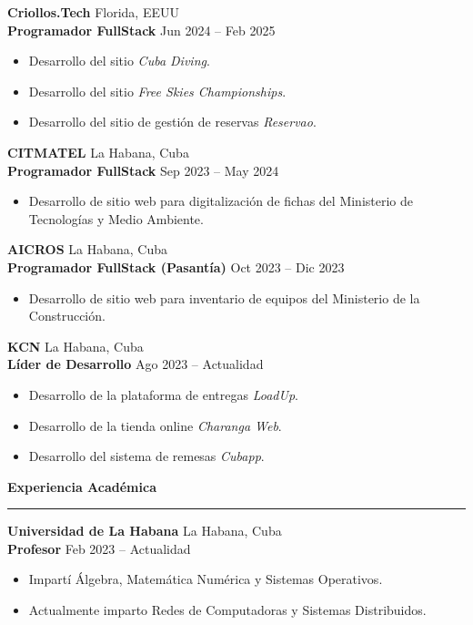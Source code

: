 \documentclass[11pt]{article}
\newcommand{\sectiontitle}[1]{%
	\vspace{30pt}
	{\large \textbf{#1}} \\
	\rule{\linewidth}{0.4pt}

}
\begin{document}
	\vspace{10pt}
	\textbf{Criollos.Tech} \hfill Florida, EEUU \\
	\textbf{Programador FullStack} \hfill Jun 2024 – Feb 2025
	\begin{itemize}[left=10pt,itemsep=3pt]
		\item Desarrollo del sitio \textit{Cuba Diving}.
		\item Desarrollo del sitio \textit{Free Skies Championships}.
		\item Desarrollo del sitio de gestión de reservas \textit{Reservao}.
	\end{itemize}
	
	\vspace{10pt}
	\textbf{CITMATEL} \hfill La Habana, Cuba \\
	\textbf{Programador FullStack} \hfill Sep 2023 – May 2024
	\begin{itemize}[left=10pt,itemsep=3pt]
		\item Desarrollo de sitio web para digitalización de fichas del Ministerio de Tecnologías y Medio Ambiente.
	\end{itemize}
	
	\vspace{10pt}
	\textbf{AICROS} \hfill La Habana, Cuba \\
	\textbf{Programador FullStack (Pasantía)} \hfill Oct 2023 – Dic 2023
	\begin{itemize}[left=10pt,itemsep=3pt]
		\item Desarrollo de sitio web para inventario de equipos del Ministerio de la Construcción.
	\end{itemize}
	
	\vspace{10pt}
	\textbf{KCN} \hfill La Habana, Cuba \\
	\textbf{Líder de Desarrollo} \hfill Ago 2023 – Actualidad
	\begin{itemize}[left=10pt,itemsep=3pt]
		\item Desarrollo de la plataforma de entregas \textit{LoadUp}.
		\item Desarrollo de la tienda online \textit{Charanga Web}.
		\item Desarrollo del sistema de remesas \textit{Cubapp}.
	\end{itemize}
	
	\sectiontitle{Experiencia Académica}
	\vspace{10pt}
	\textbf{Universidad de La Habana} \hfill La Habana, Cuba \\
	\textbf{Profesor} \hfill Feb 2023 – Actualidad
	\begin{itemize}[left=10pt,itemsep=3pt]
		\item Impartí Álgebra, Matemática Numérica y Sistemas Operativos.
		\item Actualmente imparto Redes de Computadoras y Sistemas Distribuidos.
	\end{itemize}
	
\end{document}
